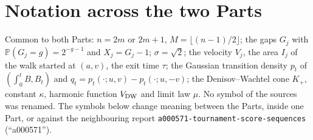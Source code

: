 \documentclass[11pt,letterpaper]{article}
\newcommand{\file}[1]{\nolinkurl{#1}}
\theoremstyle{definition}\newtheorem{remark}[theorem]{Remark}
\newcommand{\Pp}{\mathbb P}\newcommand{\Ee}{\mathbb E}
\begin{document}
\section*{Notation across the two Parts}\label{sct:sec:notation}
Common to both Parts: $n=2m$ or $2m+1$, $M=\lfloor(n-1)/2\rfloor$; the gaps $G_j$ with $\Pp(G_j=g)=2^{-g-1}$ and $X_j=G_j-1$; $\sigma=\sqrt2$; the velocity $V_j$, the area $I_j$ of the walk started at $(a,v)$, the exit time $\tau$; the Gaussian transition density $p_t$ of $(\int_0^tB,B_t)$ and $q_t=p_t(\cdot;u,v)-p_t(\cdot;u,-v)$; the Denisov--Wachtel cone $K_+$, constant $\kappa$, harmonic function $V_{\mathrm{DW}}$ and limit law $\mu$. No symbol of the sources was renamed. The symbols below change meaning between the Parts, inside one Part, or against the neighbouring report \file{a000571-tournament-score-sequences} (``a000571'').
\begingroup\small
\end{document}
